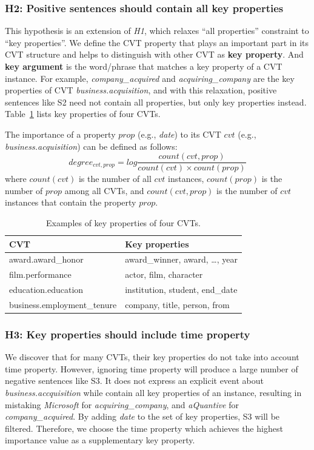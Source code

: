 \subsubsection{H2: Positive sentences should contain all key properties}
This hypothesis is an extension of \emph{H1}, which relaxes ``all properties'' constraint to ``key properties''. We define the CVT property that plays an important part in its CVT structure and helps to distinguish with other CVT as \textbf{key property}. And \textbf{key argument} is the word/phrase that matches a key property of a CVT instance. For example, \emph{company\_acquired} and \emph{acquiring\_company} are the key properties of CVT \emph{business.acquisition}, and with this relaxation, positive sentences like S2 need not contain all properties, but only key properties instead. Table~\ref{tab:5} lists key properties of four CVTs.

The importance of a property $prop$ (e.g., \emph{date}) to its CVT $cvt$ (e.g., \emph{business.acquisition}) can be defined as follows:
\begin{equation}
	degree_{cvt, prop} = log \frac{count(cvt, prop)}{count(cvt) \times count(prop)} 
\end{equation}
where $count(cvt)$ is the number of all $cvt$ instances, $count(prop)$ is the number of $prop$ among all CVTs, and $count(cvt, prop)$ is the number of $cvt$ instances that contain the property $prop$.

\begin{table}
\centering
\small
\begin{tabular}{|l|l|} \hline
CVT & Key properties \\ \hline
award.award\_honor & award\_winner, award, \ldots, year \\ \hline
film.performance & actor, film, character \\ \hline
education.education & institution, student, end\_date \\ \hline
business.employment\_tenure & company, title, person, from \\ \hline
\end{tabular}
\caption{Examples of key properties of four CVTs.\label{tab:5}}
\end{table}

\subsubsection{H3: Key properties should include time property}
We discover that for many CVTs, their key properties do not take into account time property. However, ignoring time property will produce a large number of negative sentences like S3. It does not express an explicit event about \emph{business.accquisition} while contain all key properties of an instance, resulting in mistaking \emph{Microsoft} for \emph{acquiring\_company}, and \emph{aQuantive} for \emph{company\_acquired}. By adding \emph{date} to the set of key properties, S3 will be filtered. Therefore, we choose the time property which achieves the highest importance value as a supplementary key property. 

